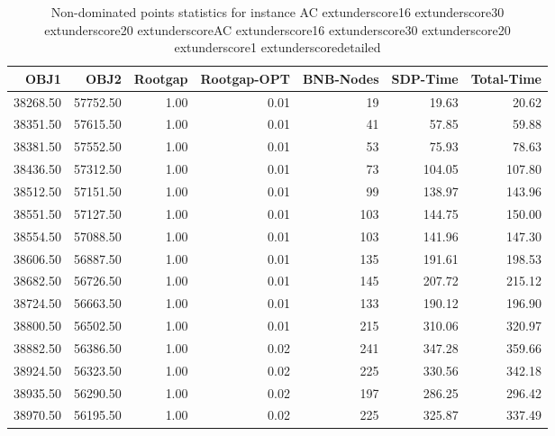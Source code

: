 \begin{table}
\caption{Non-dominated points statistics for instance AC	extunderscore16	extunderscore30	extunderscore20	extunderscoreAC	extunderscore16	extunderscore30	extunderscore20	extunderscore1	extunderscoredetailed}
\label{tab:stats/AC_16_30_20_AC_16_30_20_1_detailed}
\begin{tabular}{rrrrrrr}
\toprule
OBJ1 & OBJ2 & Rootgap & Rootgap-OPT & BNB-Nodes & SDP-Time & Total-Time \\
\midrule
38268.50 & 57752.50 & 1.00 & 0.01 & 19 & 19.63 & 20.62 \\
38351.50 & 57615.50 & 1.00 & 0.01 & 41 & 57.85 & 59.88 \\
38381.50 & 57552.50 & 1.00 & 0.01 & 53 & 75.93 & 78.63 \\
38436.50 & 57312.50 & 1.00 & 0.01 & 73 & 104.05 & 107.80 \\
38512.50 & 57151.50 & 1.00 & 0.01 & 99 & 138.97 & 143.96 \\
38551.50 & 57127.50 & 1.00 & 0.01 & 103 & 144.75 & 150.00 \\
38554.50 & 57088.50 & 1.00 & 0.01 & 103 & 141.96 & 147.30 \\
38606.50 & 56887.50 & 1.00 & 0.01 & 135 & 191.61 & 198.53 \\
38682.50 & 56726.50 & 1.00 & 0.01 & 145 & 207.72 & 215.12 \\
38724.50 & 56663.50 & 1.00 & 0.01 & 133 & 190.12 & 196.90 \\
38800.50 & 56502.50 & 1.00 & 0.01 & 215 & 310.06 & 320.97 \\
38882.50 & 56386.50 & 1.00 & 0.02 & 241 & 347.28 & 359.66 \\
38924.50 & 56323.50 & 1.00 & 0.02 & 225 & 330.56 & 342.18 \\
38935.50 & 56290.50 & 1.00 & 0.02 & 197 & 286.25 & 296.42 \\
38970.50 & 56195.50 & 1.00 & 0.02 & 225 & 325.87 & 337.49 \\
\bottomrule
\end{tabular}
\end{table}
